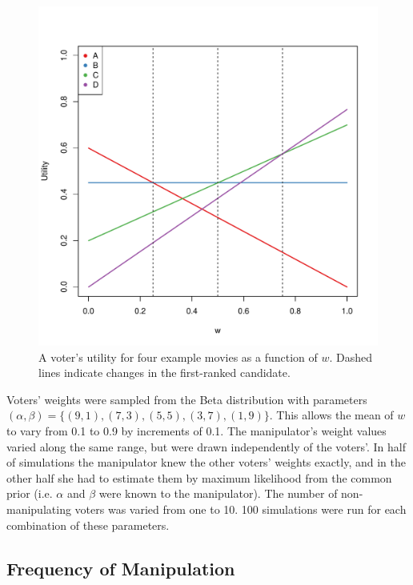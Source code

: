 \documentclass[12pt,letterpaper]{article} %
\begin{document}
\begin{figure}
\begin{center}
\includegraphics[scale=0.4]{../graphics/fakeUtils.pdf}
\caption{A voter's utility for four example movies as a function of $w$. Dashed lines indicate changes in the first-ranked candidate.}
\label{fake-utils}
\end{center}
\end{figure}

Voters' weights were sampled from the Beta distribution with parameters $(\alpha, \beta) = \{ (9,1), (7,3), (5,5), (3,7), (1,9) \}$. This allows the mean of $w$ to vary from 0.1 to 0.9 by increments of 0.1. The manipulator's weight values varied along the same range, but were drawn independently of the voters'. In half of simulations the manipulator knew the other voters' weights exactly, and in the other half she had to estimate them by maximum likelihood from the common prior (i.e. $\alpha$ and $\beta$ were known to the manipulator). The number of non-manipulating voters was varied from one to 10. 100 simulations were run for each combination of these parameters.


\subsection{Frequency of Manipulation}
\end{document}
